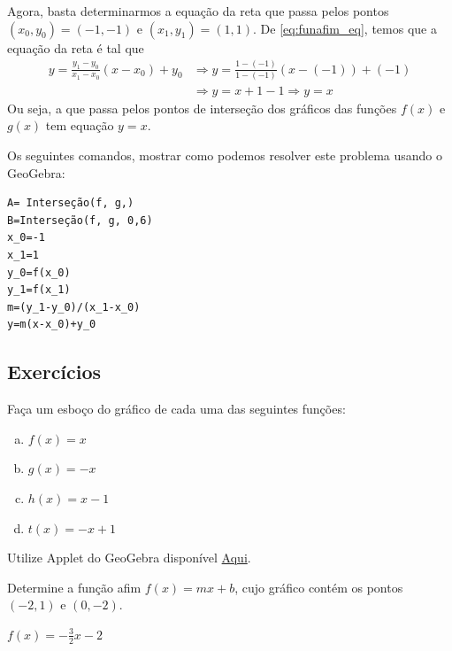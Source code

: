 \documentclass[../main.tex]{subfiles}
\begin{document}
\begin{exeresol}
\begin{resol}
  Agora, basta determinarmos a equação da reta que passa pelos pontos $(x_0, y_0) = (-1, -1)$ e $(x_1, y_1) = (1, 1)$. De \eqref{eq:funafim_eq}, temos que a equação da reta é tal que
  \begin{align*}
    y = \frac{y_1-y_0}{x_1-x_0}(x-x_0)+y_0 &\Rightarrow y = \frac{1-(-1)}{1-(-1)}(x-(-1))+(-1)\\
                                           &\Rightarrow y = x+1-1 \Rightarrow y = x
  \end{align*}
  Ou seja, a que passa pelos pontos de interseção dos gráficos das funções $f(x)$ e $g(x)$ tem equação $y = x$.

  
  Os seguintes comandos, mostrar como podemos resolver este problema usando o GeoGebra:
\begin{verbatim}
A= Interseção(f, g,)
B=Interseção(f, g, 0,6)
x_0=-1
x_1=1
y_0=f(x_0)
y_1=f(x_1)
m=(y_1-y_0)/(x_1-x_0)
y=m(x-x_0)+y_0
\end{verbatim}
\end{resol}
\end{exeresol}

\subsection{Exercícios}
\begin{exer}
  Faça um esboço do gráfico de cada uma das seguintes funções:
  \begin{multicols}{4}
  \begin{enumerate}[a)]
  \item $f(x) = x$
  \item $g(x) = -x$
  \item $h(x) = x-1$
  \item $t(x) = -x+1$
  \end{enumerate}\end{multicols}
\end{exer}
\begin{resp}
Utilize Applet do GeoGebra disponível \href{https://www.geogebra.org/m/c4mdexgd}{Aqui}.
\end{resp}

\begin{exer}
  Determine a função afim $f(x)=mx+b$, cujo gráfico contém os pontos $(-2, 1)$ e $(0, -2)$.
\end{exer}
\begin{resp}
  $f(x) = -\frac{3}{2}x - 2$
\end{resp}
\end{document}
